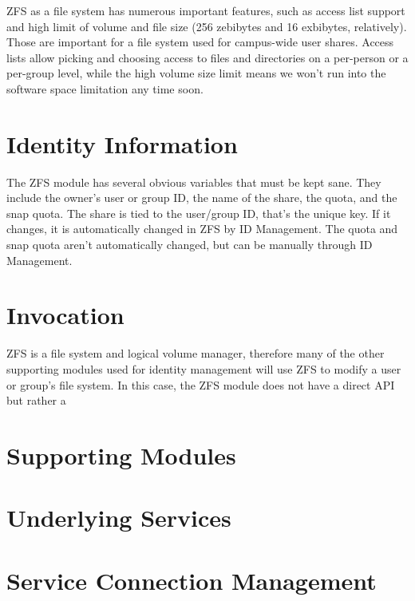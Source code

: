 \documentclass[letterpaper,12pt,titlepage]{article}
\begin{document}
ZFS as a file system has numerous important features, such as access list support and high limit of volume and file size (256 zebibytes and 16 exbibytes, relatively). Those are important for a file system used for campus-wide user shares. Access lists allow picking and choosing access to files and directories on a per-person or a per-group level, while the high volume size limit means we won't run into the software space limitation any time soon. 

\section{Identity Information}

The ZFS module has several obvious variables that must be kept sane. They include the owner's user or group ID, the name of the share, the quota, and the snap quota. The share is tied to the user/group ID, that's the unique key. If it changes, it is automatically changed in ZFS by ID Management. The quota and snap quota aren't automatically changed, but can be manually through ID Management. 

\section{Invocation}

ZFS is a file system and logical volume manager, therefore many of the other supporting modules used for identity management will use ZFS to modify a user or group's file system. In this case, the ZFS module does not have a direct API but rather a 

\section{Supporting Modules}


\section{Underlying Services}

\section{Service Connection Management}

\end{document}
